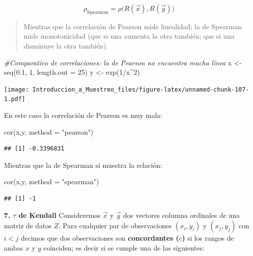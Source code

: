 \documentclass[
]{book}
\newenvironment{Shaded}{\begin{snugshade}}{\end{snugshade}}
\newcommand{\AttributeTok}[1]{\textcolor[rgb]{0.77,0.63,0.00}{#1}}
\newcommand{\CommentTok}[1]{\textcolor[rgb]{0.56,0.35,0.01}{\textit{#1}}}
\newcommand{\DecValTok}[1]{\textcolor[rgb]{0.00,0.00,0.81}{#1}}
\newcommand{\FloatTok}[1]{\textcolor[rgb]{0.00,0.00,0.81}{#1}}
\newcommand{\FunctionTok}[1]{\textcolor[rgb]{0.00,0.00,0.00}{#1}}
\newcommand{\NormalTok}[1]{#1}
\newcommand{\OtherTok}[1]{\textcolor[rgb]{0.56,0.35,0.01}{#1}}
\newcommand{\SpecialCharTok}[1]{\textcolor[rgb]{0.00,0.00,0.00}{#1}}
\newcommand{\StringTok}[1]{\textcolor[rgb]{0.31,0.60,0.02}{#1}}
\begin{document}
\[
\rho_{\text{Spearman}} =\rho\big( R(\vec{x}), R(\vec{y}))
\]

\begin{quote}
Mientras que la correlación de Pearson mide linealidad; la de Spearman mide monotonicidad (que si una aumenta la otra también; que si una disminuye la otra también).
\end{quote}

\begin{Shaded}
\begin{Highlighting}[]
\CommentTok{\#Comparativo de correlaciones: la de Pearson no encuentra mucha línea}
\NormalTok{x }\OtherTok{\textless{}{-}} \FunctionTok{seq}\NormalTok{(}\FloatTok{0.1}\NormalTok{, }\DecValTok{1}\NormalTok{, }\AttributeTok{length.out =} \DecValTok{25}\NormalTok{)}
\NormalTok{y }\OtherTok{\textless{}{-}} \FunctionTok{exp}\NormalTok{(}\DecValTok{1}\SpecialCharTok{/}\NormalTok{x}\SpecialCharTok{\^{}}\DecValTok{2}\NormalTok{)}
\end{Highlighting}
\end{Shaded}

\texttt{[image: Introduccion\_a\_Muestreo\_files/figure-latex/unnamed-chunk-107-1.pdf]}

En este caso la correlación de Pearson es muy mala:

\begin{Shaded}
\begin{Highlighting}[]
\FunctionTok{cor}\NormalTok{(x,y, }\AttributeTok{method =} \StringTok{"pearson"}\NormalTok{)}
\end{Highlighting}
\end{Shaded}

\begin{verbatim}
## [1] -0.3396831
\end{verbatim}

Mientras que la de Spearman sí muestra la relación:

\begin{Shaded}
\begin{Highlighting}[]
\FunctionTok{cor}\NormalTok{(x,y, }\AttributeTok{method =} \StringTok{"spearman"}\NormalTok{)}
\end{Highlighting}
\end{Shaded}

\begin{verbatim}
## [1] -1
\end{verbatim}

\textbf{7. \(\tau\) de Kendall} Consideremos \(\vec{x}\) y \(\vec{y}\) dos vectores columna ordinales de una matriz de datos \(Z\). Para cualquier par de observaciones \((x_i, y_i)\) y \((x_j, y_j)\) con \(i < j\) decimos que dos observaciones son \textbf{concordantes (\(c\))} si los rangos de ambas \(x\) y \(y\) coinciden; es decir si se cumple una de las siguientes:
\end{document}
